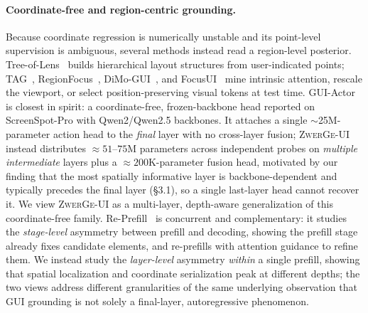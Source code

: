 \paragraph{Coordinate-free and region-centric grounding.}
Because coordinate regression is numerically unstable and its point-level supervision is ambiguous, several methods instead read a region-level posterior. Tree-of-Lens~\citep{fan2024readpointed} builds hierarchical layout structures from user-indicated points; TAG~\citep{xu2025attention}, RegionFocus~\citep{luo2025regionfocus}, DiMo-GUI~\citep{wu2025dimogui}, and FocusUI~\citep{ouyang2026focusui} mine intrinsic attention, rescale the viewport, or select position-preserving visual tokens at test time. GUI-Actor~\citep{wu2025gui} is closest in spirit: a coordinate-free, frozen-backbone head reported on ScreenSpot-Pro with Qwen2/Qwen2.5 backbones. It attaches a single $\sim$25M-parameter action head to the \emph{final} layer with no cross-layer fusion; \textsc{ZwerGe-UI} instead distributes ${\approx}51$--$75$M parameters across independent probes on \emph{multiple intermediate} layers plus a ${\approx}200$K-parameter fusion head, motivated by our finding that the most spatially informative layer is backbone-dependent and typically precedes the final layer (\S3.1), so a single last-layer head cannot recover it. We view \textsc{ZwerGe-UI} as a multi-layer, depth-aware generalization of this coordinate-free family. Re-Prefill~\citep{lin2026happens} is concurrent and complementary: it studies the \emph{stage-level} asymmetry between prefill and decoding, showing the prefill stage already fixes candidate elements, and re-prefills with attention guidance to refine them. We instead study the \emph{layer-level} asymmetry \emph{within} a single prefill, showing that spatial localization and coordinate serialization peak at different depths; the two views address different granularities of the same underlying observation that GUI grounding is not solely a final-layer, autoregressive phenomenon.

